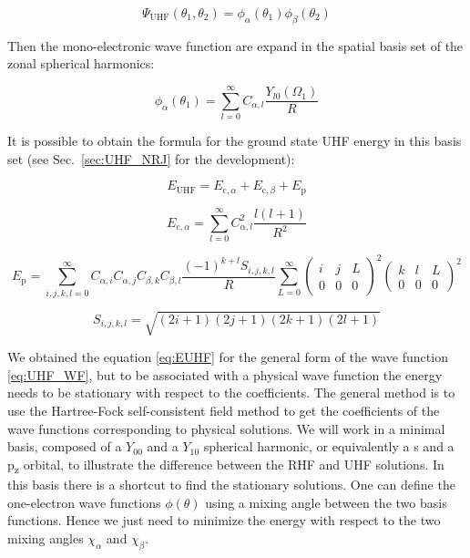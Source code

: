 \documentclass[11pt,a4paper]{article}
\begin{document}
\begin{equation}\label{eq:UHF_WF}
\Psi_{\text{UHF}}(\theta_1,\theta_2)=\phi_\alpha(\theta_1)\phi_\beta(\theta_2)
\end{equation}

Then the mono-electronic wave function are expand in the spatial basis set of the zonal spherical harmonics:

\begin{equation}
\phi_\alpha(\theta_1)=\sum\limits_{l=0}^{\infty}C_{\alpha,l}\frac{Y_{l0}(\Omega_1)}{R}
\end{equation}

It is possible to obtain the formula for the ground state UHF energy in this basis set (see Sec.~\ref{sec:UHF_NRJ} for the development):

\begin{equation}
E_{\text{UHF}} = E_{\text{c},\alpha} + E_{\text{c},\beta} + E_{\text{p}}
\end{equation}

\begin{equation}
E_{\text{c},\alpha} = \sum\limits_{l=0}^{\infty} C_{\alpha,l}^2 \frac{l(l+1)}{R^2}
\end{equation}

\begin{equation}
E_{\text{p}} = \sum\limits_{i,j,k,l=0}^{\infty}C_{\alpha,i}C_{\alpha,j}C_{\beta,k}C_{\beta,l} \frac{(-1)^{k+l}S_{i,j,k,l}}{R}\sum\limits_{L=0}^{\infty} \begin{pmatrix}
 i & j & L \\
 0 & 0 & 0
\end{pmatrix}^2 \begin{pmatrix}
 k & l & L \\
 0 & 0 & 0
\end{pmatrix}^2
\label{eq:EUHF}
\end{equation}

\begin{equation*}
S_{i,j,k,l}=\sqrt{(2i+1)(2j+1)(2k+1)(2l+1)}
\end{equation*}

We obtained the equation \eqref{eq:EUHF} for the general form of the wave function \eqref{eq:UHF_WF}, but to be associated with a physical wave function the energy needs to be stationary with respect to the coefficients. The general method is to use the Hartree-Fock self-consistent field method \cite{SzaboBook} to get the coefficients of the wave functions corresponding to physical solutions. We will work in a minimal basis, composed  of a $Y_{00}$ and a $Y_{10}$ spherical harmonic, or equivalently a s and a p\textsubscript{z} orbital, to illustrate the difference between the RHF and UHF solutions. In this basis there is a shortcut to find the stationary solutions. One can define the one-electron wave functions $\phi(\theta)$ using a mixing angle between the two basis functions. Hence we just need to minimize the energy with respect to the two mixing angles $\chi_\alpha$ and $\chi_\beta$.
\end{document}
